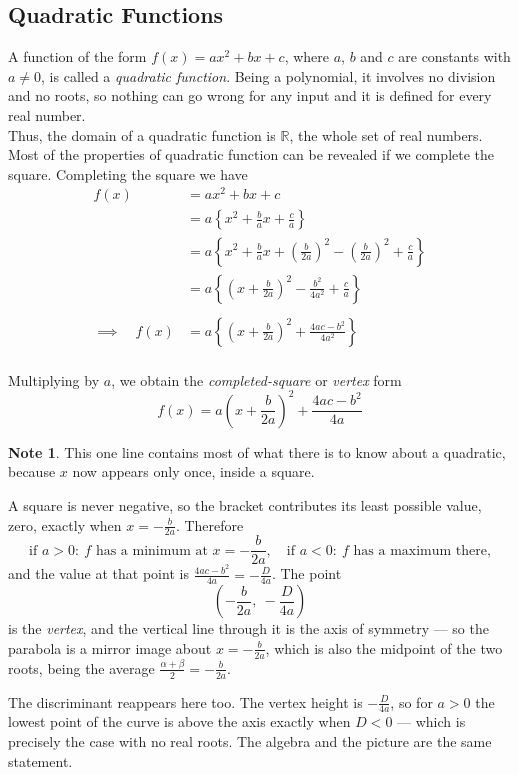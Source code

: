 \documentclass[11pt,a4paper]{article}
\theoremstyle{definition}
\newtheorem{note}[thm]{Note}
\begin{document}
\subsection{Quadratic Functions}
A function of the form $f(x)=ax^{2}+bx+c$, where $a$, $b$ and $c$ are constants
with $a\neq 0$, is called a \emph{quadratic function}. Being a polynomial, it
involves no division and no roots, so nothing can go wrong for any input and it is
defined for every real number.\\
Thus, the domain of a quadratic function is $\mathbb{R}$, the whole set of real numbers.\\
Most of the properties of quadratic function can be revealed if we complete the square. Completing the square we have
\begin{align*}
f(x) & = ax^2+bx+c\\
     & = a\left\{x^2+\frac{b}{a}x+\frac{c}{a}\right\}\\
     & = a\left\{x^2+\frac{b}{a}x+\left(\frac{b}{2a}\right)^2-\left(\frac{b}{2a}\right)^2+\frac{c}{a}\right\}\\
     & = a\left\{\left(x+\frac{b}{2a}\right)^2-\frac{b^2}{4a^2}+\frac{c}{a}\right\}\\\\
\implies \quad  f(x) & = a\left\{\left(x+\frac{b}{2a}\right)^2+\frac{4ac-b^2}{4a^2}\right\}\\
\end{align*}

Multiplying by $a$, we obtain the \emph{completed-square} or \emph{vertex} form
$$f(x)=a\left(x+\frac{b}{2a}\right)^2+\frac{4ac-b^2}{4a}$$

\begin{note}
This one line contains most of what there is to know about a quadratic, because
$x$ now appears only once, inside a square.

A square is never negative, so the bracket contributes its least possible value,
zero, exactly when $x=-\frac{b}{2a}$. Therefore
$$\text{if } a>0:\ f \text{ has a minimum at } x=-\frac{b}{2a},\quad 
\text{if } a<0:\ f \text{ has a maximum there,}$$
and the value at that point is $\frac{4ac-b^{2}}{4a}=-\frac{D}{4a}$. The point
$$\left(-\frac{b}{2a},\ -\frac{D}{4a}\right)$$
is the \emph{vertex}, and the vertical line through it is the axis of symmetry --- so
the parabola is a mirror image about $x=-\frac{b}{2a}$, which is also the midpoint
of the two roots, being the average $\frac{\alpha+\beta}{2}=-\frac{b}{2a}$.

The discriminant reappears here too. The vertex height is $-\frac{D}{4a}$, so for
$a>0$ the lowest point of the curve is above the axis exactly when $D<0$ --- which
is precisely the case with no real roots. The algebra and the picture are the same
statement.
\end{note}
\end{document}
